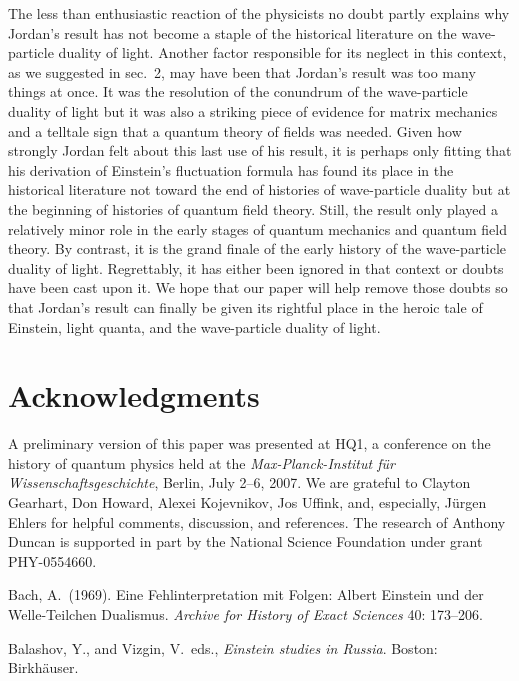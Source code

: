 \documentclass{elsart}
\begin{document}
{The less than enthusiastic reaction of the physicists no doubt partly explains why Jordan's result has not become a staple of the historical literature on the wave-particle duality of light.  Another factor responsible for its neglect in this context, as we suggested in sec.\ 2, may have been that Jordan's result was too many things at once. It was the resolution of the conundrum of the wave-particle duality of light but it was also a striking piece of evidence for matrix mechanics and a telltale sign that a quantum theory of fields was needed.  Given how strongly Jordan felt about this last use of his result, it is perhaps only fitting that his derivation of Einstein's fluctuation formula has found its place in the historical literature not  toward the end of histories of wave-particle duality but at the beginning of histories of quantum field theory.  Still, the result only played a relatively minor role in the early stages of quantum mechanics and quantum field theory.  By contrast, it is the grand finale of the early history of the wave-particle duality of light. Regrettably, it has either been ignored in that context  or doubts have been cast upon it. We hope that our paper will help remove those doubts so that Jordan's result can finally be given its rightful place in the heroic tale of Einstein, light quanta, and the wave-particle duality of light.


\section*{Acknowledgments}
  
A preliminary version of this paper was presented at HQ1, a conference on the history of quantum physics held at the {\it Max-Planck-Institut f\"ur Wissenschaftsgeschichte}, Berlin, July 2--6, 2007. We are  grateful to Clayton Gearhart, Don Howard, Alexei Kojevnikov, Jos Uffink, and, especially, J\"{u}rgen Ehlers for helpful comments, discussion, and references. The research of Anthony Duncan is supported in part by the National Science Foundation under grant PHY-0554660.


\begin{thebibliography}{}

 Bach, A.\ (1969). Eine Fehlinterpretation mit Folgen: Albert Einstein und der Welle-Teilchen Dualismus. {\it Archive for History of Exact Sciences} 40: 173--206.

 Balashov, Y., and Vizgin, V.\  eds., {\it Einstein studies in Russia}. Boston: Birkh\"{a}user.


\end{thebibliography}}
\end{document}
